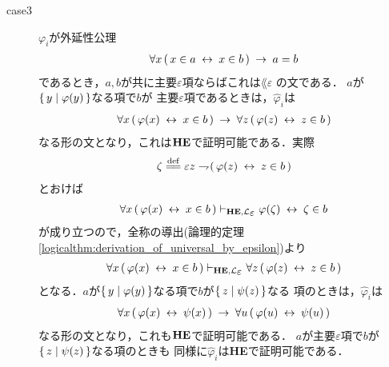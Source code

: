 \begin{metaprf}
\begin{description}
			\item[case3] $\varphi_{i}$が外延性公理
				\begin{align}
					\forall x\, (\, x \in a \hspace{0.25em}\leftrightarrow\hspace{0.25em} x \in b\, ) \hspace{0.25em}\rightarrow\hspace{0.25em} a = b
				\end{align}
				であるとき，$a,b$が共に主要$\varepsilon$項ならばこれは$\lang{\varepsilon}$
				の文である．
				$a$が$\{\, y \mid \varphi(y)\, \}$なる項で$b$が
				主要$\varepsilon$項であるときは，$\widehat{\varphi}_{i}$は
				\begin{align}
					\forall x\, (\, \varphi(x) \hspace{0.25em}\leftrightarrow\hspace{0.25em} x \in b\, ) \hspace{0.25em}\rightarrow\hspace{0.25em} 
					\forall z\, (\, \varphi(z) \hspace{0.25em}\leftrightarrow\hspace{0.25em} z \in b\, )
				\end{align}
				なる形の文となり，これは${\bf HE}$で証明可能である．実際
				\begin{align}
					\zeta \defeq \varepsilon z \negation (\, \varphi(z) \lrarrow z \in b\, )
				\end{align}
				とおけば
				\begin{align}
					\forall x\, (\, \varphi(x) \lrarrow x \in b\, ) 
					\provable{\mbox{{\bf HE}},\lang{\varepsilon}} \varphi(\zeta) \lrarrow \zeta \in b
				\end{align}
				が成り立つので，全称の導出(論理的定理\ref{logicalthm:derivation_of_universal_by_epsilon})より
				\begin{align}
					\forall x\, (\, \varphi(x) \lrarrow x \in b\, ) 
					\provable{\mbox{{\bf HE}},\lang{\varepsilon}}
					\forall z\, (\, \varphi(z) \lrarrow z \in b\, )
				\end{align}
				となる．$a$が$\{\, y \mid \varphi(y)\, \}$なる項で$b$が$\{\, z \mid \psi(z)\, \}$なる
				項のときは，$\widehat{\varphi}_{i}$は
				\begin{align}
					\forall x\, (\, \varphi(x) \hspace{0.25em}\leftrightarrow\hspace{0.25em} \psi(x)\, ) \hspace{0.25em}\rightarrow\hspace{0.25em} 
					\forall u\, (\, \varphi(u) \hspace{0.25em}\leftrightarrow\hspace{0.25em} \psi(u)\, )
				\end{align}
				なる形の文となり，これも${\bf HE}$で証明可能である．
				$a$が主要$\varepsilon$項で$b$が$\{\, z \mid \psi(z)\, \}$なる項のときも
				同様に$\widehat{\varphi}_{i}$は{\bf HE}で証明可能である．
			

\end{description}
\end{metaprf}
